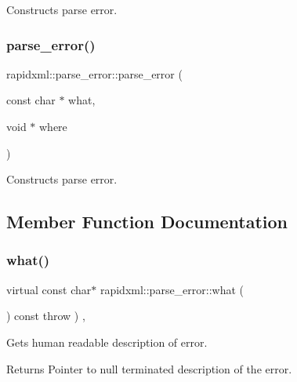 Constructs parse error. 

\mbox{\label{classrapidxml_1_1parse__error_aea12a301271c393fb627b368fb9f35c1}} 
\subsubsection{\texorpdfstring{parse\+\_\+error()}{parse\_error()}\hspace{0.1cm}{\footnotesize\ttfamily [2/2]}}
{\footnotesize\ttfamily rapidxml\+::parse\+\_\+error\+::parse\+\_\+error (\begin{DoxyParamCaption}\item[{const char $\ast$}]{what,  }\item[{void $\ast$}]{where }\end{DoxyParamCaption})\hspace{0.3cm}{\ttfamily [inline]}}



Constructs parse error. 



\subsection{Member Function Documentation}
\mbox{\label{classrapidxml_1_1parse__error_a986003116ebcb49a69a20228da306232}} 
\subsubsection{\texorpdfstring{what()}{what()}\hspace{0.1cm}{\footnotesize\ttfamily [1/2]}}
{\footnotesize\ttfamily virtual const char$\ast$ rapidxml\+::parse\+\_\+error\+::what (\begin{DoxyParamCaption}{ }\end{DoxyParamCaption}) const throw  ) \hspace{0.3cm}{\ttfamily [inline]}, {\ttfamily [virtual]}}

Gets human readable description of error. \begin{DoxyReturn}{Returns}
Pointer to null terminated description of the error. 
\end{DoxyReturn}
\mbox{\label{classrapidxml_1_1parse__error_a986003116ebcb49a69a20228da306232}} 
